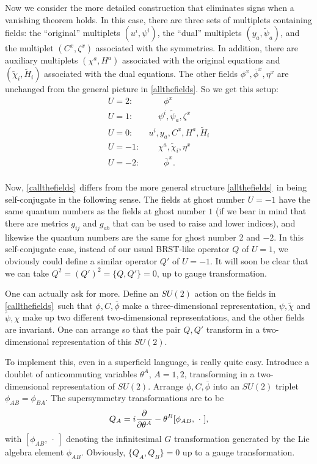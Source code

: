 \documentclass[12pt]{article}
\numberwithin{equation}{section}
\def\tilde{\widetilde}
\def\bar{\overline}
\begin{document}
Now we consider the more detailed construction that eliminates
signs when a vanishing theorem holds.  In this case, there
are three sets of multiplets containing  fields: the ``original'' multiplets
$(u^i,\psi^i)$,
the ``dual'' multiplets $(y_a,\tilde\psi_a)$,
and the multiplet $(C^x,\zeta^x)$ associated with the
symmetries.  In addition,
there are auxiliary multiplets $(\chi^a,H^a)$ associated with the original
equations and $(\tilde\chi_i,\tilde H_i)$
associated with the dual equations.  The
other fields $\phi^x,\bar\phi^x,\eta^x$
are unchanged from  the general picture in \eqref{allthefields}.  So we get
this setup:
\begin{equation}
  \label{callthefields}
  \begin{aligned} U=2: &  ~~~~~~~~~ \phi^x\\ U=1: &
    ~~~~~~\psi^i,\tilde\psi_a,\zeta^x   \\ U=0: & ~u^i,y_a,C^x,
    H^a,\tilde H_i \\ U=-1:& ~~~~~~\chi^a,\tilde\chi_i, \eta^x
    \\ U=-2: &  ~~~~~~~~~\bar\phi^x .\\
  \end{aligned}
\end{equation}

Now, \eqref{callthefields}\ differs from the more general
structure \eqref{allthefields}\ in being self-conjugate
in the following sense.  The fields at ghost number $U=-1$ have the
same quantum numbers as the fields at ghost number $1$ (if we bear in mind
  that there are metrics $g_{ij}$ and $g_{ab}$ that can be used to raise
and lower indices), and likewise the quantum numbers are the same
for ghost number 2 and $-2$.
In this self-conjugate case, instead of our usual BRST-like operator
$Q$ of $U=1$, we obviously could define a similar operator
$Q'$ of $U=-1$.  It will soon be clear that we can take
$Q^2=(Q')^2=\{Q,Q'\}=0$, up to gauge transformation.

One can actually ask for more.  Define an $SU(2)$ action
on the fields in \eqref{callthefields}\ such that $\phi,C,\bar\phi$ make
a three-dimensional representation,  $\psi,\tilde\chi$  and $\tilde\psi,\chi$
make up two different two-dimensional representations, and the other
fields are invariant.  One can arrange so that the pair
$Q,Q'$ transform in a two-dimensional
representation of this $SU(2)$.

To implement this, even in a superfield language, is really quite
easy.  Introduce a doublet of anticommuting variables $\theta^A$, $A=1,2$,
transforming in a two-dimensional representation of $SU(2)$.  Arrange
$\phi,C,\bar\phi$ into an $SU(2)$ triplet $\phi_{AB}=\phi_{BA}$.
The supersymmetry transformations are to be
\begin{equation}
  \label{suptobe}
  Q_A=i{\partial\over\partial\theta^A}-\theta^B[\phi_{AB},~\cdot~],
\end{equation}
with $[\phi_{AB},~\cdot~]$ denoting the infinitesimal $G$ transformation
generated by the Lie algebra element $\phi_{AB}$.
Obviously, $\{Q_A,Q_B\}=0$ up to a gauge transformation.
\end{document}

